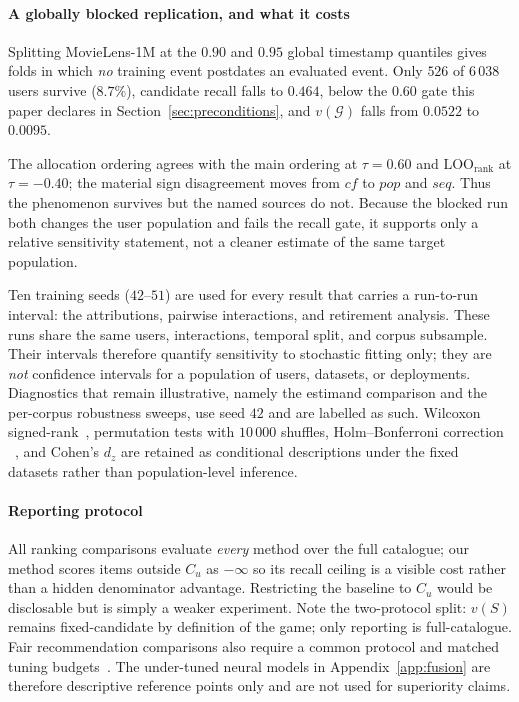 \documentclass[pdflatex,sn-basic,Numbered]{sn-jnl}
\theoremstyle{plain}
\theoremstyle{definition}
\newcommand{\G}{\mathcal{G}}
\newcommand{\Cu}{C_u}
\newcommand{\LOOr}{\mathrm{LOO}_{\mathrm{rank}}}
\begin{document}
\paragraph{A globally blocked replication, and what it costs}
Splitting MovieLens-1M at the
$0.90$ and $0.95$ global timestamp quantiles gives folds in which \emph{no}
training event postdates an evaluated event. Only $526$ of $6\,038$ users
survive ($8.7\%$), candidate recall falls to $0.464$, below the
$0.60$ gate this paper declares in Section~\ref{sec:preconditions}, and
$v(\G)$ falls from $0.0522$ to $0.0095$.

The allocation ordering agrees with the main ordering at $\tau=0.60$ and
$\LOOr$ at $\tau=-0.40$; the material sign disagreement moves from $cf$ to
$pop$ and $seq$. Thus the phenomenon survives but the named sources do not.
Because the blocked run both changes the user population and fails the recall
gate, it supports only a relative sensitivity statement, not a cleaner
estimate of the same target population.

Ten training seeds ($42$--$51$) are used for every result that carries a
run-to-run interval: the attributions, pairwise interactions, and retirement
analysis. These runs share the same users, interactions, temporal split, and
corpus subsample. Their intervals therefore quantify sensitivity to stochastic
fitting only; they are \emph{not} confidence intervals for a population of
users, datasets, or deployments. Diagnostics that remain illustrative, namely the
estimand comparison and the per-corpus robustness sweeps, use seed $42$ and are
labelled as such. Wilcoxon signed-rank~\citep{wilcoxon1945individual},
permutation tests with $10\,000$ shuffles, Holm--Bonferroni correction
~\citep{holm1979simple}, and Cohen's $d_z$ are retained as conditional
descriptions under the fixed datasets rather than population-level inference.

\paragraph{Reporting protocol}
All ranking comparisons evaluate \emph{every} method over the full catalogue;
our method scores items outside $\Cu$ as $-\infty$ so its recall ceiling is a
visible cost rather than a hidden denominator advantage. Restricting the
baseline to $\Cu$ would be disclosable but is simply a weaker experiment. Note
the two-protocol split: $v(S)$ remains fixed-candidate by definition of the
game; only reporting is full-catalogue.
Fair recommendation comparisons also require a common protocol and matched
tuning budgets~\citep{sun2020evaluating}. The under-tuned neural models in
Appendix~\ref{app:fusion} are therefore descriptive reference points only and
are not used for superiority claims.
\end{document}
